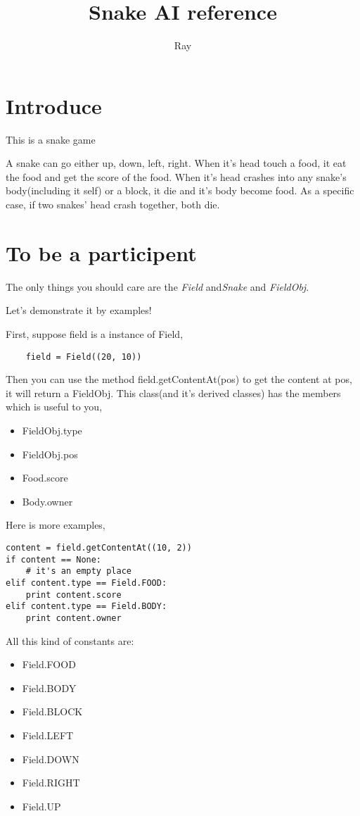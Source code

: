 \documentclass[11pt,a4paper]{article}
\newcommand{\classname}[1]{{\itshape{}#1}}
\begin{document}

\title{Snake AI reference}
\author{Ray}
\maketitle
\section{Introduce}
This is a snake game

A snake can go either up, down, left, right. When it's head touch a food, it eat the food and get the score of the food.
When it's head crashes into any snake's body(including it self) or a block, it die and it's body become food. As a specific case, if two snakes' head
crash together, both die.

\section{To be a participent}
The only things you should care are the \classname{Field} and\classname{Snake} and \classname{FieldObj}.

Let's demonstrate it by examples!

First, suppose field is a instance of Field,
\begin{lstlisting}
	field = Field((20, 10))
\end{lstlisting}
Then you can use the method field.getContentAt(pos) to get the content at pos, it will return a FieldObj.
This class(and it's derived classes) has the members which is useful to you,
\begin{itemize}
	\item FieldObj.type
	\item FieldObj.pos
	\item Food.score
	\item Body.owner
\end{itemize}

Here is more examples,
\begin{lstlisting}
content = field.getContentAt((10, 2))
if content == None:
	# it's an empty place
elif content.type == Field.FOOD:
	print content.score
elif content.type == Field.BODY:
	print content.owner
\end{lstlisting}

All this kind of constants are:
\begin{itemize}
	\item Field.FOOD
	\item Field.BODY
	\item Field.BLOCK
	\item Field.LEFT
	\item Field.DOWN
	\item Field.RIGHT
	\item Field.UP
\end{itemize}
\end{document}
